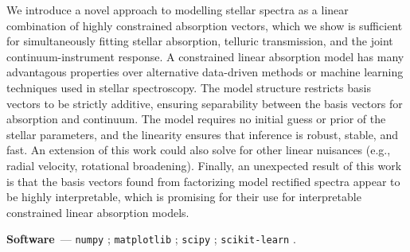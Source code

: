 \documentclass[modern]{aastex631}
\renewcommand{\paragraph}[1]{\medskip\par\noindent\textbf{#1}~---}
\begin{document}
We introduce a novel approach to modelling stellar spectra as a linear combination of highly constrained absorption vectors, which we show is sufficient for simultaneously fitting stellar absorption, telluric transmission, and the joint continuum-instrument response. A constrained linear absorption model has many advantagous properties over alternative data-driven methods or machine learning techniques used in stellar spectroscopy. The model structure restricts basis vectors to be strictly additive, ensuring separability between the basis vectors for absorption and continuum. The model requires no initial guess or prior of the stellar parameters, and the linearity ensures that inference is robust, stable, and fast. An extension of this work could also solve for other linear nuisances (e.g., radial velocity, rotational broadening). Finally, an unexpected result of this work is that the basis vectors found from factorizing model rectified spectra appear to be highly interpretable, which is promising for their use for interpretable constrained linear absorption models.\\










\paragraph{Software}
\texttt{numpy} \citep{numpy}; 
\texttt{matplotlib} \citep{matplotlib}; 
\texttt{scipy} \citep{scipy};
\texttt{scikit-learn} \citep{scikit_learn}.
\end{document}
